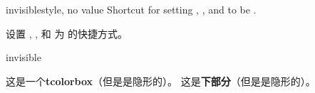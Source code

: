 \begin{docTcbKey}[][doc new and updated={2015-01-06}{2019-03-01}]{invisible}{}{style, no value}
Shortcut for setting , , and 
to be .

设置 , , 和  为  的快捷方式。
\begin{exdispExample}{invisible}
\begin{tcolorbox}[invisible]
这是一个\textbf{tcolorbox}（但是是隐形的）。
\tcblower
这是\textbf{下部分}（但是是隐形的）。
\end{tcolorbox}
\end{exdispExample}
\end{docTcbKey}




